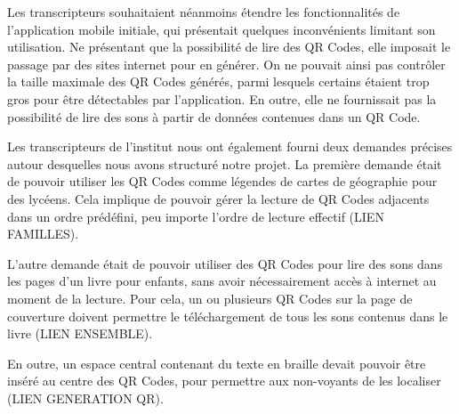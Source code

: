 \par
Les transcripteurs souhaitaient néanmoins étendre les fonctionnalités de l'application mobile initiale, qui présentait quelques inconvénients limitant son utilisation. Ne présentant que la possibilité de lire des QR Codes, elle imposait le passage par des sites internet pour en générer. On ne pouvait ainsi pas contrôler la taille maximale des QR Codes générés, parmi lesquels certains étaient trop gros pour être détectables par l'application. En outre, elle ne fournissait pas la possibilité de lire des sons à partir de données contenues dans un QR Code.\\

\par
Les transcripteurs de l'institut nous ont également fourni deux demandes précises autour desquelles nous avons structuré notre projet. La première demande était de pouvoir utiliser les QR Codes comme légendes de cartes de géographie pour des lycéens. Cela implique de pouvoir gérer la lecture de QR Codes adjacents dans un ordre prédéfini, peu importe l'ordre de lecture effectif (LIEN FAMILLES).
\par
L'autre demande était de pouvoir utiliser des QR Codes pour lire des sons dans les pages d'un livre pour enfants, sans avoir nécessairement accès à internet au moment de la lecture. Pour cela, un ou plusieurs QR Codes sur la page de couverture doivent permettre le téléchargement de tous les sons contenus dans le livre (LIEN ENSEMBLE).
\par
En outre, un espace central contenant du texte en braille devait pouvoir être inséré au centre des QR Codes, pour permettre aux non-voyants de les localiser (LIEN GENERATION QR).